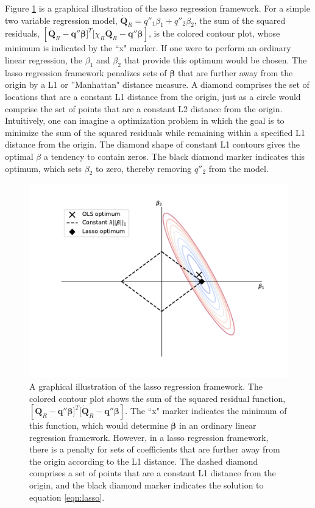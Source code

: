 \documentclass{article}
\begin{document}
Figure \ref{fig:lasso_graphic} is a graphical illustration of the lasso regression framework. For a simple two variable regression model, $\boldsymbol{\dot{Q}}_{R} = q''_1\beta_1 + q''_2\beta_2$, the sum of the squared residuals, $[\boldsymbol{\dot{Q}}_{R} - \boldsymbol{q}'' \boldsymbol{\beta}\big]^T\big[\chi_R \boldsymbol{\dot{Q}}_{R} - \boldsymbol{q}'' \boldsymbol{\beta}]$, is the colored contour plot, whose minimum is indicated by the ``x" marker. If one were to perform an ordinary linear regression, the $\beta_1$ and $\beta_2$ that provide this optimum would be chosen. The lasso regression framework penalizes sets of $\boldsymbol{\beta}$ that are further away from the origin by a L1 or ''Manhattan" distance measure. A diamond comprises the set of locations that are a constant L1 distance from the origin, just as a circle would comprise the set of points that are a constant L2 distance from the origin. Intuitively, one can imagine a optimization problem in which the goal is to minimize the sum of the squared residuals while remaining within a specified L1 distance from the origin. The diamond shape of constant L1 contours gives the optimal $\beta$ a tendency to contain zeros. The black diamond marker indicates this optimum, which sets $\beta_2$ to zero, thereby removing $q''_2$ from the model. 

\begin{figure}[htb] \centering
\includegraphics[width=.75\textwidth]{./figures/lasso_graphic.pdf}
\caption{A graphical illustration of the lasso regression framework. The colored contour plot shows the sum of the squared residual function, $[ \boldsymbol{\dot{Q}}_{R} - \boldsymbol{q}'' \boldsymbol{\beta}\big]^T\big[ \boldsymbol{\dot{Q}}_{R} - \boldsymbol{q}'' \boldsymbol{\beta}]$. The ``x" marker indicates the minimum of this function, which would determine $\boldsymbol{\beta}$ in an ordinary linear regression framework. However, in a lasso regression framework, there is a penalty for sets of coefficients that are further away from the origin according to the L1 distance. The dashed diamond comprises a set of points that are a constant L1 distance from the origin, and the black diamond marker indicates the solution to equation \protect\ref{eqn:lasso}.}
\label{fig:lasso_graphic}
\end{figure}
\end{document}
